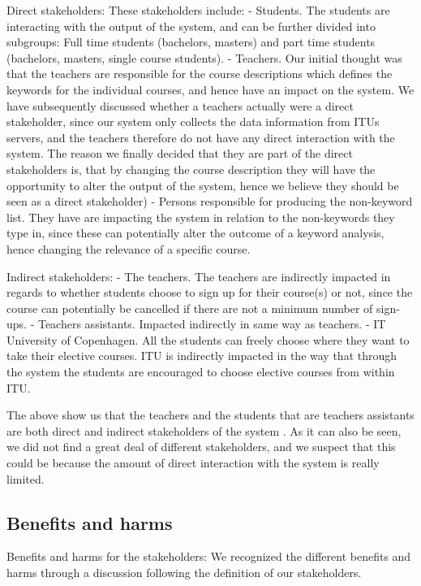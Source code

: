 Direct stakeholders:  These stakeholders include:
- Students. The students are interacting with the output of the system, and can be further divided into subgroups: Full time students (bachelors, masters) and part time students (bachelors, masters, single course students).
- Teachers. Our initial thought was that the teachers are responsible for the course descriptions which defines the keywords for the individual courses, and hence have an impact on the system. We have subsequently discussed whether a teachers actually were a direct stakeholder, since our system only collects the data information from ITUs servers, and the teachers therefore do not have any direct interaction with the system. The reason we finally decided that they are part of the direct stakeholders is, that by changing the course description they will have the opportunity to alter the output of the system, hence we believe they should be seen as a direct stakeholder)
- Persons responsible for producing the non-keyword list. They have are impacting the system in relation to the non-keywords they type in, since these can potentially alter the outcome of a keyword analysis, hence changing the relevance of a specific course.

Indirect stakeholders: 
- The teachers. The teachers are indirectly impacted in regards to whether students choose to sign up for their course(s) or not, since the course can potentially be cancelled if there are not a minimum number of sign-ups.
- Teachers assistants. Impacted indirectly in same way as teachers.
- IT University of Copenhagen. All the students can freely choose where they want to take their elective courses. ITU is indirectly impacted in the way that  through the system the students are encouraged to choose elective courses from within ITU. 


The above show us that the teachers and the students that are teachers assistants are both direct and indirect stakeholders of the system . As it can also be seen, we did not find a great deal of different stakeholders, and we suspect that this could be because the amount of direct interaction with the system is really limited. 


\subsection{Benefits and harms}

Benefits and harms for the stakeholders:
We recognized the different benefits and harms through a discussion following the definition of our stakeholders.

